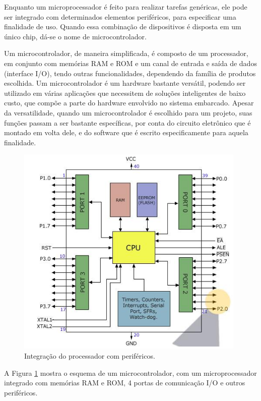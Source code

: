 Enquanto um microprocessador é feito para realizar tarefas genéricas, ele pode ser integrado com determinados elementos periféricos, para especificar uma finalidade de uso. Quando essa combinação de dispositivos é disposta em um único chip, dá-se o nome de microcontrolador.

Um microcontrolador, de maneira simplificada, é composto de um processador, em conjunto com memórias RAM e ROM e um canal de entrada e saída de dados (interface I/O), tendo outras funcionalidades, dependendo da família de produtos escolhida. Um microcontrolador é um hardware bastante versátil, podendo ser utilizado em várias aplicações que necessitem de soluções inteligentes de baixo custo, que compõe a parte do hardware envolvido no sistema embarcado. Apesar da versatilidade, quando um microcontrolador é escolhido para um projeto, suas funções passam a ser bastante específicas, por conta do circuito eletrônico que é montado em volta dele, e do software que é escrito especificamente para aquela finalidade.

\begin{figure}[ht]
    \begin{center}
    \includegraphics{figuras/microprocessador.PNG}
    \end{center}
    \caption[Microcontrolador]{Integração do processador com periféricos.}
    \label{microcontrolador}
\end{figure}

A Figura \ref{microcontrolador} mostra o esquema de um microcontrolador, com um microprocessador integrado com memórias RAM e ROM, 4 portas de comunicação I/O e outros periféricos.


